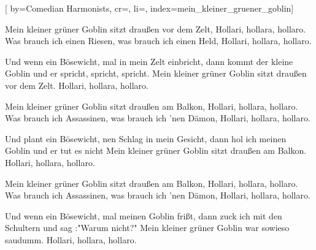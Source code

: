 
[%
    by={Comedian Harmonists},
    cr={},
    li={},
    index={mein_kleiner_gruener_goblin}]


    \label{mein_kleiner_gruener_goblin}

    \beginverse\memorize[verse]
        Mein kleiner grüner Goblin sitzt draußen vor dem Zelt,
        Hollari, hollara, hollaro.
        Was brauch ich einen Riesen, was brauch ich einen Held,
        Hollari, hollara, hollaro.
    \endverse

    \beginchorus\memorize[chorus]
        Und wenn ein Bösewicht, mal in mein Zelt einbricht,
        dann kommt der kleine Goblin und er spricht, spricht, spricht.
        Mein kleiner grüner Goblin sitzt draußen vor dem Zelt.
        Hollari, hollara, hollaro.
    \endchorus


    \beginverse\replay[verse]
        Mein kleiner grüner Goblin sitzt draußen am Balkon,
        Hollari, hollara, hollaro.
        Was brauch ich Assassinen, was brauch ich 'nen Dämon,
        Hollari, hollara, hollaro.
    \endverse

    \beginchorus\replay[chorus]
        Und plant ein Bösewicht, nen Schlag in mein Gesicht,
        dann hol ich meinen Goblin und er tut es nicht
        Mein kleiner grüner Goblin sitzt draußen am Balkon.
        Hollari, hollara, hollaro.
    \endchorus

    \beginverse\replay[verse]
        Mein kleiner grüner Goblin sitzt draußen am Balkon,
        Hollari, hollara, hollaro.
        Was brauch ich Assassinen, was brauch ich 'nen Dämon,
        Hollari, hollara, hollaro.
    \endverse

    \beginchorus\replay[chorus]
        Und wenn ein Bösewicht, mal meinen Goblin frißt,
        dann zuck ich mit den Schultern und sag :"Warum nicht?"
        Mein kleiner grüner Goblin war sowieso saudumm.
        Hollari, hollara, hollaro.
    \endchorus
\endsong
